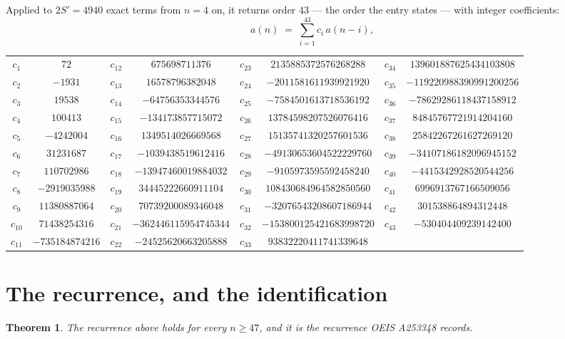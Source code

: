 \documentclass[11pt,a4paper]{article}
\theoremstyle{plain}
\newtheorem{theorem}{Theorem}
\theoremstyle{definition}
\begin{document}
Applied to $2S'=4940$ exact terms from $n=4$ on, it returns order $43$ --- the
order the entry states --- with integer coefficients:
\[
a(n)\;=\;\sum_{i=1}^{43}c_i\,a(n-i),
\]
\begin{center}\small
\begin{tabular}{cccccccc}
$c_{1}$ & $72$ & $c_{12}$ & $675698711376$ & $c_{23}$ & $2135885372576268288$ & $c_{34}$ & $139601887625434103808$ \\
$c_{2}$ & $-1931$ & $c_{13}$ & $16578796382048$ & $c_{24}$ & $-2011581611939921920$ & $c_{35}$ & $-119220988390991200256$ \\
$c_{3}$ & $19538$ & $c_{14}$ & $-64756353344576$ & $c_{25}$ & $-7584501613718536192$ & $c_{36}$ & $-78629286118437158912$ \\
$c_{4}$ & $100413$ & $c_{15}$ & $-134173857715072$ & $c_{26}$ & $13784598207526076416$ & $c_{37}$ & $84845767721914204160$ \\
$c_{5}$ & $-4242004$ & $c_{16}$ & $1349514026669568$ & $c_{27}$ & $15135741320257601536$ & $c_{38}$ & $25842267261627269120$ \\
$c_{6}$ & $31231687$ & $c_{17}$ & $-1039438519612416$ & $c_{28}$ & $-49130653604522229760$ & $c_{39}$ & $-34107186182096945152$ \\
$c_{7}$ & $110702986$ & $c_{18}$ & $-13947460019884032$ & $c_{29}$ & $-9105973595592458240$ & $c_{40}$ & $-4415342928520544256$ \\
$c_{8}$ & $-2919035988$ & $c_{19}$ & $34445222660911104$ & $c_{30}$ & $108430684964582850560$ & $c_{41}$ & $6996913767166509056$ \\
$c_{9}$ & $11380887064$ & $c_{20}$ & $70739200089346048$ & $c_{31}$ & $-32076543208607186944$ & $c_{42}$ & $301538864894312448$ \\
$c_{10}$ & $71438254316$ & $c_{21}$ & $-362446115954745344$ & $c_{32}$ & $-153800125421683998720$ & $c_{43}$ & $-530404409239142400$ \\
$c_{11}$ & $-735184874216$ & $c_{22}$ & $-24525620663205888$ & $c_{33}$ & $93832220411741339648$ &  &  \\
\end{tabular}
\end{center}

\section{The recurrence, and the identification}

\begin{theorem}
The recurrence above holds for every $n\ge47$, and it is the recurrence OEIS A253348 records.
\end{theorem}
\end{document}
